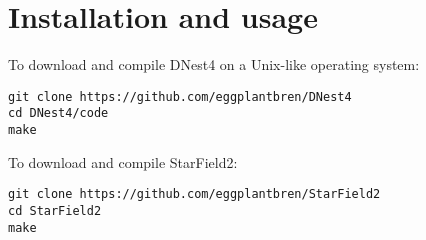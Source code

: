 \documentclass[a4paper,fleqn,usenatbib]{mnras}
\begin{document}

\appendix
\section{Installation and usage}

To download and compile DNest4 on a Unix-like operating system:

\begin{verbatim}
git clone https://github.com/eggplantbren/DNest4
cd DNest4/code
make
\end{verbatim}

To download and compile StarField2:

\begin{verbatim}
git clone https://github.com/eggplantbren/StarField2
cd StarField2
make
\end{verbatim}





\bsp	%
\label{lastpage}
\end{document}
